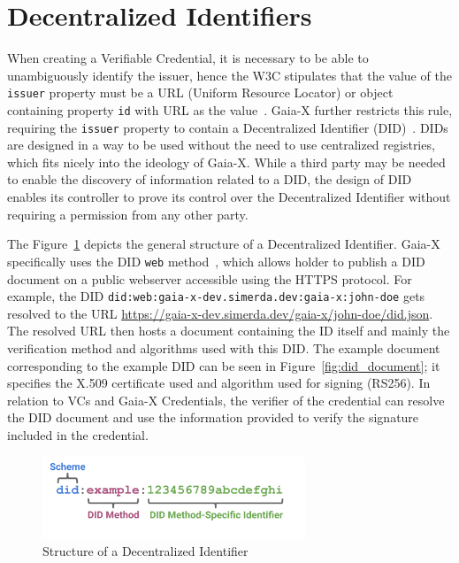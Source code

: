 \section{Decentralized Identifiers}\label{sec:decentralized-identifiers}

When creating a Verifiable Credential, it is necessary to be able to unambiguously identify the issuer, hence the W3C stipulates that the value of the \texttt{issuer} property must be a URL (Uniform Resource Locator) or object containing property \texttt{id} with URL as the value~\cite{verifiable_credentials}.
Gaia-X further restricts this rule, requiring the \texttt{issuer} property to contain a Decentralized Identifier (DID)~\cite{did}.
DIDs are designed in a way to be used without the need to use centralized registries, which fits nicely into the ideology of Gaia-X.
While a third party may be needed to enable the discovery of information related to a DID, the design of DID enables its controller to prove its control over the Decentralized Identifier without requiring a permission from any other party.

The Figure~\ref{fig:did_structure} depicts the general structure of a Decentralized Identifier.
Gaia-X specifically uses the DID \texttt{web} method~\cite{didweb}, which allows holder to publish a DID document on a public webserver accessible using the HTTPS protocol.
For example, the DID \texttt{did:web:gaia-x-dev.simerda.dev:gaia-x:john-doe} gets resolved to the URL \url{https://gaia-x-dev.simerda.dev/gaia-x/john-doe/did.json}.
The resolved URL then hosts a document containing the ID itself and mainly the verification method and algorithms used with this DID.
The example document corresponding to the example DID can be seen in Figure~\ref{fig:did_document}; it specifies the X.509 certificate used and algorithm used for signing (RS256).
In relation to VCs and Gaia-X Credentials, the verifier of the credential can resolve the DID document and use the information provided to verify the signature included in the credential.

\begin{figure}
    \centering
    \includegraphics[width=0.7\textwidth]{figures/parts-of-a-did.png}
    \caption{Structure of a Decentralized Identifier~\cite{did}}\label{fig:did_structure}
\end{figure}

